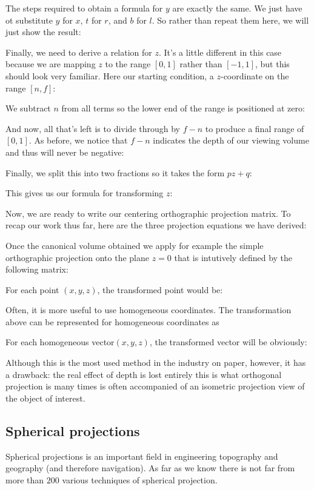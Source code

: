 	The steps required to obtain a formula for $y$ are exactly the same. We just have ot substitute $y$ for $x$, $t$ for $r$, and $b$ for $l$. So rather than repeat them here, we will just show the result:
	
	Finally, we need to derive a relation for $z$. It's a little different in this case because we are mapping $z$ to the range $[0, 1]$ rather than $[-1, 1]$, but this should look very familiar. Here our starting condition, a $z$-coordinate on the range $[n, f]$:
	
	We subtract $n$ from all terms so the lower end of the range is positioned at zero:
	
	And now, all that's left is to divide through by $f - n$ to produce a final range of $[0, 1]$. As before, we notice that $f - n$ indicates the depth of our viewing volume and thus will never be negative:
	
	Finally, we split this into two fractions so it takes the form $pz + q$:
	
	This gives us our formula for transforming $z$:
	
	Now, we are ready to write our centering orthographic projection matrix. To recap our work thus far, here are the three projection equations we have derived:
	
	Once the canonical volume obtained we apply for example the simple orthographic projection onto the plane $z = 0$ that is intutively defined by the following matrix:
	
	For each point $(x, y, z)$, the transformed point would be:
	
	Often, it is more useful to use homogeneous coordinates. The transformation above can be represented for homogeneous coordinates as
	
	For each homogeneous vector$(x,y,z)$, the transformed vector will be obviously:
	
	Although this is the most used method in the industry on paper, however, it has a drawback: the real effect of depth is lost entirely this is what orthogonal projection is many times is often accompanied of an isometric projection view of the object of interest.
	
	\pagebreak
	\subsection{Spherical projections}
	Spherical projections is an important field in engineering topography and geography (and therefore navigation). As far as we know there is not far from more than $200$ various techniques of spherical projection. 
	

